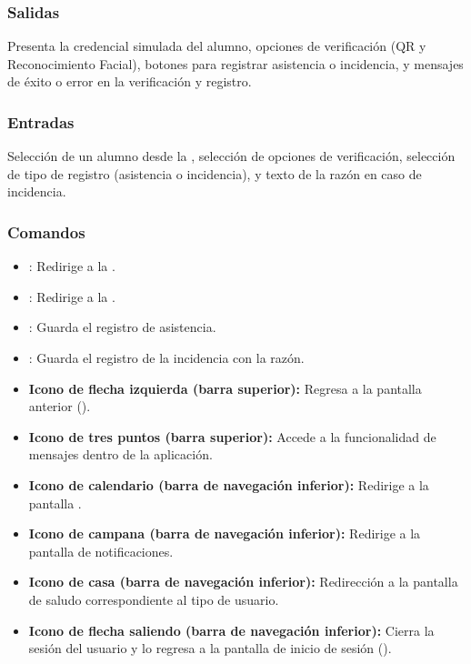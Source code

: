 \subsubsection{Salidas}
Presenta la credencial simulada del alumno, opciones de verificación (QR y Reconocimiento Facial), botones para registrar asistencia o incidencia, y mensajes de éxito o error en la verificación y registro.

\subsubsection{Entradas}
Selección de un alumno desde la , selección de opciones de verificación, selección de tipo de registro (asistencia o incidencia), y texto de la razón en caso de incidencia.

\subsubsection{Comandos}
\begin{itemize}
	\item {}: Redirige a la .
	\item {}: Redirige a la .
	\item {}: Guarda el registro de asistencia.
	\item {}: Guarda el registro de la incidencia con la razón.
	\item \textbf{Icono de flecha izquierda (barra superior):} Regresa a la pantalla anterior ().
	\item \textbf{Icono de tres puntos (barra superior):} Accede a la funcionalidad de mensajes dentro de la aplicación.
	\item \textbf{Icono de calendario (barra de navegación inferior):} Redirige a la pantalla .
	\item \textbf{Icono de campana (barra de navegación inferior):} Redirige a la pantalla de notificaciones.
	\item \textbf{Icono de casa (barra de navegación inferior):} Redirección a la pantalla de saludo correspondiente al tipo de usuario.
	\item \textbf{Icono de flecha saliendo (barra de navegación inferior):} Cierra la sesión del usuario y lo regresa a la pantalla de inicio de sesión ().
\end{itemize}

